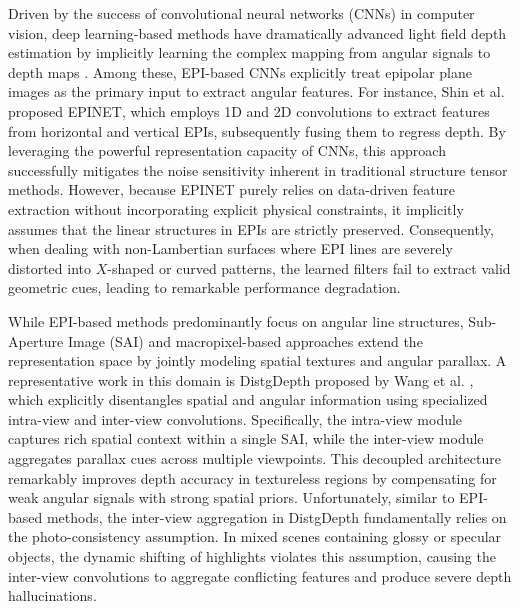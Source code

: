 \documentclass[lettersize,journal]{IEEEtran}
\begin{document}
Driven by the success of convolutional neural networks (CNNs) in computer vision, deep learning-based methods have dramatically advanced light field depth estimation by implicitly learning the complex mapping from angular signals to depth maps \cite{deep_learning,light_field_depth_estimation}. Among these, EPI-based CNNs explicitly treat epipolar plane images as the primary input to extract angular features. For instance, Shin et al. \cite{Shin,EPINET} proposed EPINET, which employs 1D and 2D convolutions to extract features from horizontal and vertical EPIs, subsequently fusing them to regress depth. By leveraging the powerful representation capacity of CNNs, this approach successfully mitigates the noise sensitivity inherent in traditional structure tensor methods. However, because EPINET purely relies on data-driven feature extraction without incorporating explicit physical constraints, it implicitly assumes that the linear structures in EPIs are strictly preserved. Consequently, when dealing with non-Lambertian surfaces where EPI lines are severely distorted into $X$-shaped or curved patterns, the learned filters fail to extract valid geometric cues, leading to remarkable performance degradation.

While EPI-based methods predominantly focus on angular line structures, Sub-Aperture Image (SAI) and macropixel-based approaches extend the representation space by jointly modeling spatial textures and angular parallax. A representative work in this domain is DistgDepth proposed by Wang et al. \cite{Wang,DistgDepth}, which explicitly disentangles spatial and angular information using specialized intra-view and inter-view convolutions. Specifically, the intra-view module captures rich spatial context within a single SAI, while the inter-view module aggregates parallax cues across multiple viewpoints. This decoupled architecture remarkably improves depth accuracy in textureless regions by compensating for weak angular signals with strong spatial priors. Unfortunately, similar to EPI-based methods, the inter-view aggregation in DistgDepth fundamentally relies on the photo-consistency assumption. In mixed scenes containing glossy or specular objects, the dynamic shifting of highlights violates this assumption, causing the inter-view convolutions to aggregate conflicting features and produce severe depth hallucinations.
\end{document}
